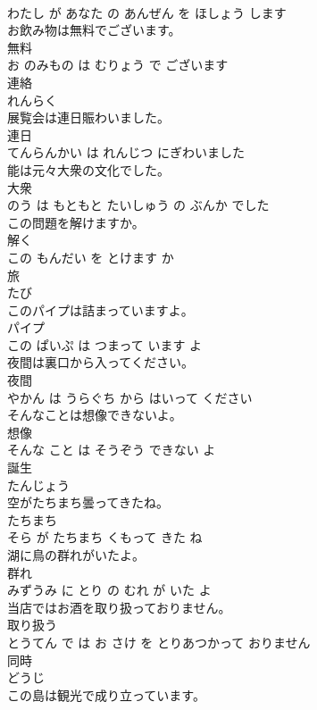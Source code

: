 \documentclass[8pt]{extreport}
\begin{document}
\begin{CJK}{UTF8}{min}
\\	わたし が あなた の あんぜん を ほしょう します			
\\	お飲み物は無料でございます。	
\\	無料 
\\	お のみもの は むりょう で ございます			
\\	連絡	
\\	れんらく		
\\	展覧会は連日賑わいました。	
\\	連日 
\\	てんらんかい は れんじつ にぎわいました			
\\	能は元々大衆の文化でした。	
\\	大衆 
\\	のう は もともと たいしゅう の ぶんか でした			
\\	この問題を解けますか。	
\\	解く 
\\	この もんだい を とけます か			
\\	旅	
\\	たび		
\\	このパイプは詰まっていますよ。	
\\	パイプ 
\\	この ぱいぷ は つまって います よ			
\\	夜間は裏口から入ってください。	
\\	夜間 
\\	やかん は うらぐち から はいって ください			
\\	そんなことは想像できないよ。	
\\	想像 
\\	そんな こと は そうぞう できない よ			
\\	誕生	
\\	たんじょう		
\\	空がたちまち曇ってきたね。	
\\	たちまち 
\\	そら が たちまち くもって きた ね			
\\	湖に鳥の群れがいたよ。	
\\	群れ 
\\	みずうみ に とり の むれ が いた よ			
\\	当店ではお酒を取り扱っておりません。	
\\	取り扱う 
\\	とうてん で は お さけ を とりあつかって おりません			
\\	同時	
\\	どうじ		
\\	この島は観光で成り立っています。	

\end{CJK}
\end{document}
